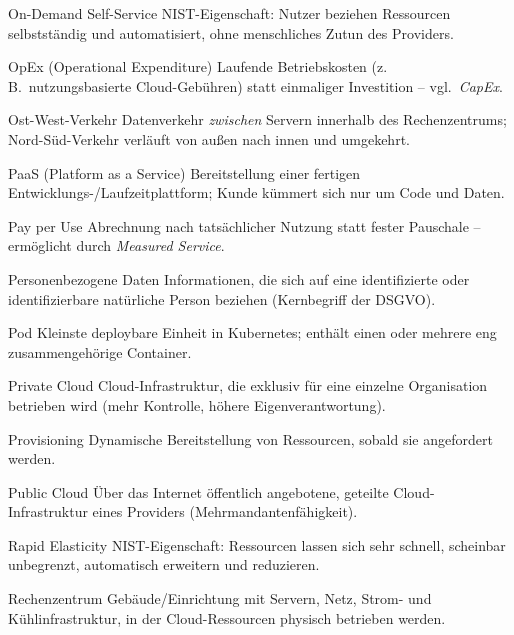 \begin{glossar}
  \item[On-Demand Self-Service] NIST-Eigenschaft: Nutzer beziehen Ressourcen
        selbstständig und automatisiert, ohne menschliches Zutun des Providers.

  \item[OpEx (Operational Expenditure)] Laufende Betriebskosten (z.\,B.\
        nutzungsbasierte Cloud-Gebühren) statt einmaliger Investition -- vgl.\ \emph{CapEx}.

  \item[Ost-West-Verkehr] Datenverkehr \emph{zwischen} Servern innerhalb des
        Rechenzentrums; Nord-Süd-Verkehr verläuft von außen nach innen und umgekehrt.

  \item[PaaS (Platform as a Service)] Bereitstellung einer fertigen
        Entwicklungs-/Laufzeitplattform; Kunde kümmert sich nur um Code und Daten.

  \item[Pay per Use] Abrechnung nach tatsächlicher Nutzung statt fester
        Pauschale -- ermöglicht durch \emph{Measured Service}.

  \item[Personenbezogene Daten] Informationen, die sich auf eine identifizierte
        oder identifizierbare natürliche Person beziehen (Kernbegriff der DSGVO).

  \item[Pod] Kleinste deploybare Einheit in Kubernetes; enthält einen oder
        mehrere eng zusammengehörige Container.

  \item[Private Cloud] Cloud-Infrastruktur, die exklusiv für eine einzelne
        Organisation betrieben wird (mehr Kontrolle, höhere Eigenverantwortung).

  \item[Provisioning] Dynamische Bereitstellung von Ressourcen, sobald sie
        angefordert werden.

  \item[Public Cloud] Über das Internet öffentlich angebotene, geteilte
        Cloud-Infrastruktur eines Providers (Mehrmandantenfähigkeit).

  \item[Rapid Elasticity] NIST-Eigenschaft: Ressourcen lassen sich sehr schnell,
        scheinbar unbegrenzt, automatisch erweitern und reduzieren.

  \item[Rechenzentrum] Gebäude/Einrichtung mit Servern, Netz, Strom- und
        Kühlinfrastruktur, in der Cloud-Ressourcen physisch betrieben werden.


\end{glossar}
